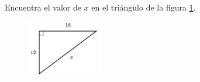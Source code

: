 \question[15]  Encuentra el valor de $x$ en el triángulo de la figura \ref{fig:lados_pitagoras_05}.
\begin{figure}[H]
    \begin{center}
        \includegraphics[width=0.3\textwidth]{../images/lados_pitagoras_05.png}
    \end{center}
    \caption{}
    \label{fig:lados_pitagoras_05}
\end{figure}